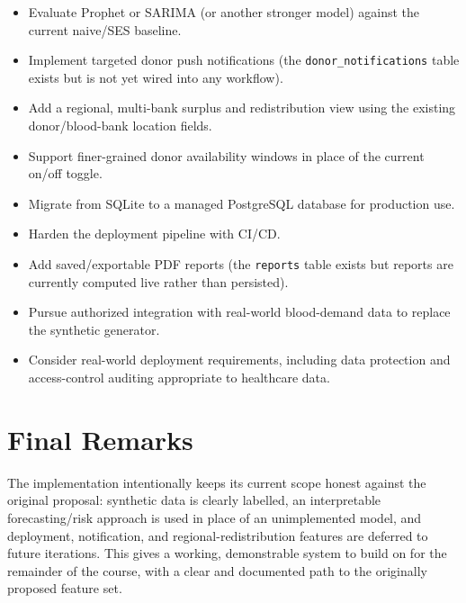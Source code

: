 \documentclass[12pt,twoside]{report}
\begin{document}
\begin{itemize}
\item Evaluate Prophet or SARIMA (or another stronger model) against the current naive/SES baseline.
\item Implement targeted donor push notifications (the \texttt{donor\_notifications} table exists but is not yet wired into any workflow).
\item Add a regional, multi-bank surplus and redistribution view using the existing donor/blood-bank location fields.
\item Support finer-grained donor availability windows in place of the current on/off toggle.
\item Migrate from SQLite to a managed PostgreSQL database for production use.
\item Harden the deployment pipeline with CI/CD.
\item Add saved/exportable PDF reports (the \texttt{reports} table exists but reports are currently computed live rather than persisted).
\item Pursue authorized integration with real-world blood-demand data to replace the synthetic generator.
\item Consider real-world deployment requirements, including data protection and access-control auditing appropriate to healthcare data.
\end{itemize}

\section{Final Remarks}

The implementation intentionally keeps its current scope honest against the original proposal: synthetic data is clearly labelled, an interpretable forecasting/risk approach is used in place of an unimplemented model, and deployment, notification, and regional-redistribution features are deferred to future iterations. This gives a working, demonstrable system to build on for the remainder of the course, with a clear and documented path to the originally proposed feature set.
\end{document}
